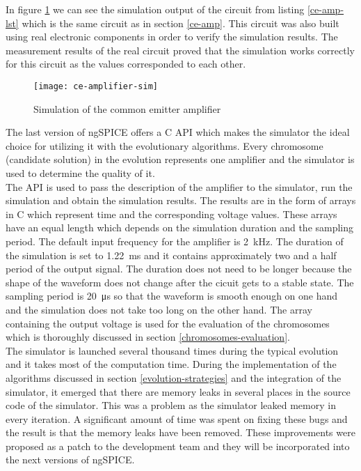 In figure \ref{ce-amplifier-sim} we can see the simulation output of the circuit from listing \ref{ce-amp-lst} which is the same circuit as in section \ref{ce-amp}. This circuit was also built using real electronic components in order to verify the simulation results. The measurement results of the real circuit proved that the simulation works correctly for this circuit as the values corresponded to each other.

\begin{figure}[H]
    \centering
    \texttt{[image: ce-amplifier-sim]}\label{ce-amplifier-sim}
    \caption{Simulation of the common emitter amplifier}
\end{figure}

The last version of ngSPICE offers a C API which makes the simulator the ideal choice for utilizing it with the evolutionary algorithms. Every chromosome (candidate solution) in the evolution represents one amplifier and the simulator is used to determine the quality of it.\\
The API is used to pass the description of the amplifier to the simulator, run the simulation and obtain the simulation results. The results are in the form of arrays in C which represent time and the corresponding voltage values. These arrays have an equal length which depends on the simulation duration and the sampling period. The default input frequency for the amplifier is \SI{2}{\kilo\hertz}. The duration of the simulation is set to \SI{1.22}{\milli\second} and it contains approximately two and a half period of the output signal. The duration does not need to be longer because the shape of the waveform does not change after the cicuit gets to a stable state. The sampling period is \SI{20}{\micro\second} so that the waveform is smooth enough on one hand and the simulation does not take too long on the other hand. The array containing the output voltage is used for the evaluation of the chromosomes which is thoroughly discussed in section \ref{chromosomes-evaluation}.\\
The simulator is launched several thousand times during the typical evolution and it takes most of the computation time. During the implementation of the algorithms discussed in section \ref{evolution-strategies} and the integration of the simulator, it emerged that there are memory leaks in several places in the source code of the simulator. This was a problem as the simulator leaked memory in every iteration. A significant amount of time was spent on fixing these bugs and the result is that the memory leaks have been removed. These improvements were proposed as a patch to the development team and they will be incorporated into the next versions of ngSPICE.